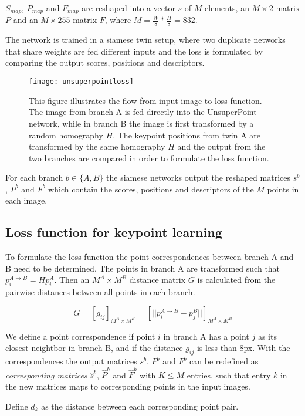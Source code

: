 $S_{map}$, $P_{map}$ and $F_{map}$ are reshaped into a vector $s$ of $M$ elements, an $M\times 2$ matrix $P$ and an $M\times 255$ matrix $F$, where $M=\frac{W}{8}*\frac{H}{8}=832$.

The network is trained in a siamese twin setup, where two duplicate networks that share weights are fed different inputs and the loss is formulated by comparing the output scores, positions and descriptors.

\begin{figure}[H]
	\centering
	\texttt{[image: unsuperpointloss]}
	\caption{This figure illustrates the flow from input image to loss function. The image from branch A is fed directly into the UnsuperPoint network, while in branch B the image is first transformed by a random homography $H$. The keypoint positions from twin A are transformed by the same homography $H$ and the output from the two branches are compared in order to formulate the loss function.}
	\label{fig:unsuperpointloss}
\end{figure}

For each branch $b\in\{A,B\}$ the siamese networks output the reshaped matrices $s^b$, $P^b$ and $F^b$ which contain the scores, positions and descriptors of the $M$ points in each image.

\subsection{Loss function for keypoint learning}

To formulate the loss function the point correspondences between branch A and B need to be determined. The points in branch A are transformed such that $p_i^{A\rightarrow B}=Hp_i^A$. Then an $M^A\times M^B$ distance matrix $G$ is calculated from the pairwise distances between all points in each branch.

\[
G=[g_{ij}]_{M^A\times M^B}=\left[||p_i^{A\rightarrow B}-p_j^B||\right]_{M^A\times M^B}
\]

We define a point correspondence if point $i$ in branch A has a point $j$ as its closest neightbor in branch B, and if the distance $g_{ij}$ is less than 8px. With the correspondences the output matrices $s^b$, $P^b$ and $F^b$ can be redefined as \textit{corresponding matrices} $\hat{s}^b$, $\hat{P}^b$ and $\hat{F}^b$ with $K\le M$ entries, such that entry $k$ in the new matrices maps to corresponding points in the input images.

Define $d_k$ as the distance between each corresponding point pair.

